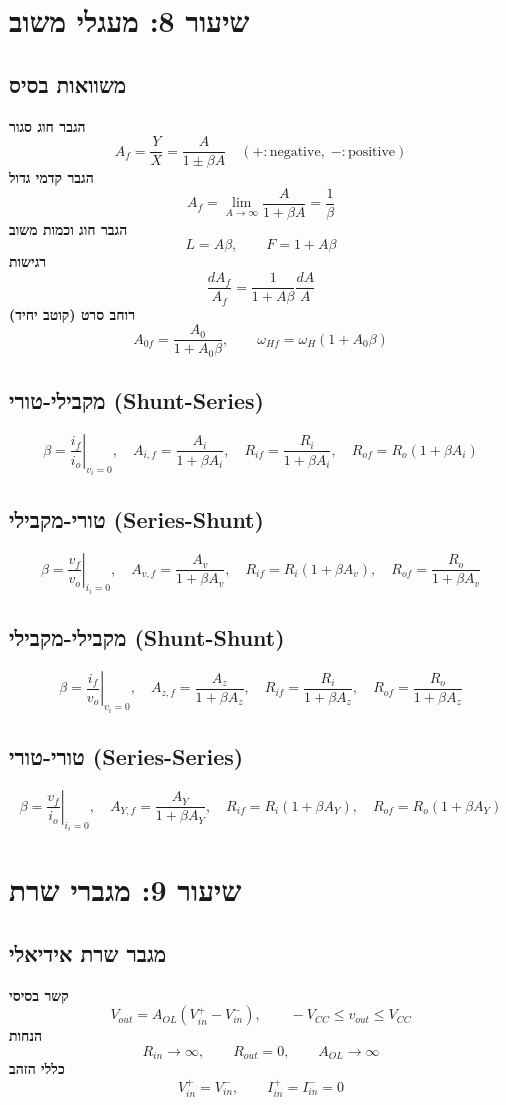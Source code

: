 \documentclass[11pt]{article}
\begin{document}
\section{שיעור 8: מעגלי משוב}
\subsection*{משוואות בסיס}
\textbf{הגבר חוג סגור}
\[A_f=\frac{Y}{X}=\frac{A}{1\pm\beta A}\quad(+:\text{negative},\;-:\text{positive})\]
\textbf{הגבר קדמי גדול}
\[A_f=\lim_{A\to\infty}\frac{A}{1+\beta A}=\frac1\beta\]
\textbf{הגבר חוג וכמות משוב}
\[L=A\beta,\qquad F=1+A\beta\]
\textbf{רגישות}
\[\frac{dA_f}{A_f}=\frac{1}{1+A\beta}\frac{dA}{A}\]
\textbf{רוחב סרט (קוטב יחיד)}
\[A_{0f}=\frac{A_0}{1+A_0\beta},\qquad \omega_{Hf}=\omega_H\left(1+A_0\beta\right)\]
\subsection*{מקבילי-טורי (Shunt-Series)}
\[\beta=\left.\frac{i_f}{i_o}\right|_{v_i=0},\quad A_{i,f}=\frac{A_i}{1+\beta A_i},\quad R_{if}=\frac{R_i}{1+\beta A_i},\quad R_{of}=R_o\left(1+\beta A_i\right)\]
\subsection*{טורי-מקבילי (Series-Shunt)}
\[\beta=\left.\frac{v_f}{v_o}\right|_{i_i=0},\quad A_{v,f}=\frac{A_v}{1+\beta A_v},\quad R_{if}=R_i\left(1+\beta A_v\right),\quad R_{of}=\frac{R_o}{1+\beta A_v}\]
\subsection*{מקבילי-מקבילי (Shunt-Shunt)}
\[\beta=\left.\frac{i_f}{v_o}\right|_{v_i=0},\quad A_{z,f}=\frac{A_z}{1+\beta A_z},\quad R_{if}=\frac{R_i}{1+\beta A_z},\quad R_{of}=\frac{R_o}{1+\beta A_z}\]
\subsection*{טורי-טורי (Series-Series)}
\[\beta=\left.\frac{v_f}{i_o}\right|_{i_i=0},\quad A_{Y,f}=\frac{A_Y}{1+\beta A_Y},\quad R_{if}=R_i\left(1+\beta A_Y\right),\quad R_{of}=R_o\left(1+\beta A_Y\right)\]
\section{שיעור 9: מגברי שרת}
\subsection*{מגבר שרת אידיאלי}
\textbf{קשר בסיסי}
\[V_{out}=A_{OL}\left(V_{in}^+-V_{in}^-\right),\qquad -V_{CC}\le v_{out}\le V_{CC}\]
\textbf{הנחות}
\[R_{in}\to\infty,\qquad R_{out}=0,\qquad A_{OL}\to\infty\]
\textbf{כללי הזהב}
\[V_{in}^+=V_{in}^-,\qquad I_{in}^+=I_{in}^-=0\]
\end{document}
